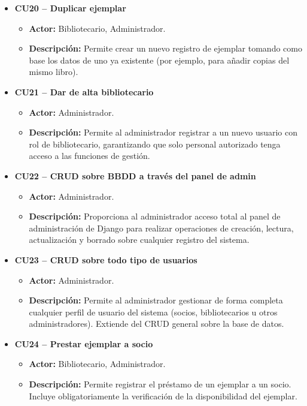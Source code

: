 \begin{itemize}
	\item \textbf{CU20 -- Duplicar ejemplar}
	\begin{itemize}
		\item \textbf{Actor:} Bibliotecario, Administrador.
		\item \textbf{Descripción:} Permite crear un nuevo registro de ejemplar tomando como base los datos de uno ya existente (por ejemplo, para añadir copias del mismo libro).
	\end{itemize}
	
	\item \textbf{CU21 -- Dar de alta bibliotecario}
	\begin{itemize}
		\item \textbf{Actor:} Administrador.
		\item \textbf{Descripción:} Permite al administrador registrar a un nuevo usuario con rol de bibliotecario, garantizando que solo personal autorizado tenga acceso a las funciones de gestión.
	\end{itemize}
	
	\item \textbf{CU22 -- CRUD sobre BBDD a través del panel de admin}
	\begin{itemize}
		\item \textbf{Actor:} Administrador.
		\item \textbf{Descripción:} Proporciona al administrador acceso total al panel de administración de Django para realizar operaciones de creación, lectura, actualización y borrado sobre cualquier registro del sistema.
	\end{itemize}
		
	\item \textbf{CU23 -- CRUD sobre todo tipo de usuarios}
	\begin{itemize}
		\item \textbf{Actor:} Administrador.
		\item \textbf{Descripción:} Permite al administrador gestionar de forma completa cualquier perfil de usuario del sistema (socios, bibliotecarios u otros administradores). Extiende del CRUD general sobre la base de datos.
	\end{itemize}
	
	\item \textbf{CU24 -- Prestar ejemplar a socio}
	\begin{itemize}
		\item \textbf{Actor:} Bibliotecario, Administrador.
		\item \textbf{Descripción:} Permite registrar el préstamo de un ejemplar a un socio. Incluye obligatoriamente la verificación de la disponibilidad del ejemplar.
	\end{itemize}
	

\end{itemize}
